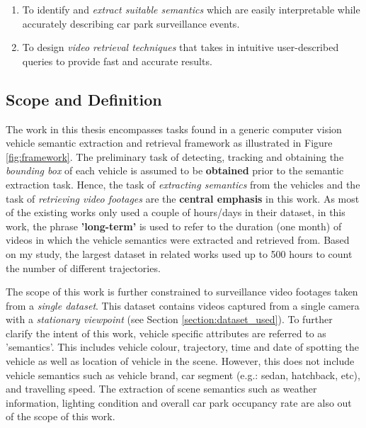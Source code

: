 \begin{enumerate}
  \item To identify and \textit{extract suitable semantics} which are easily interpretable while accurately describing car park surveillance events.
  \item To design \textit{video retrieval techniques} that takes in intuitive user-described queries to provide fast and accurate results.
\end{enumerate}

\subsection{Scope and Definition}
\label{subsec:scope}
The work in this thesis encompasses tasks found in a generic computer vision vehicle semantic extraction and retrieval framework as illustrated in Figure \ref{fig:framework}. The preliminary task of detecting, tracking and obtaining the \textit{bounding box} of each vehicle is assumed to be \textbf{obtained} prior to the semantic extraction task.
Hence, the task of \textit{extracting semantics} from the vehicles and the task of \textit{retrieving video footages} are the \textbf{central emphasis} in this work.
As most of the existing works only used a couple of hours/days in their dataset, in this work, the phrase \textbf{'long-term'} is used to refer to the duration (one month) of videos in which the vehicle semantics were extracted and retrieved from. Based on my study, the largest dataset in related works used up to 500 hours to count the number of different trajectories.


The scope of this work is further constrained to surveillance video footages taken from a \textit{single dataset}. This dataset contains videos captured from a single camera with a \textit{stationary viewpoint} (see Section \ref{section:dataset_used}). To further clarify the intent of this work, vehicle specific attributes are referred to as 'semantics'. This includes vehicle colour, trajectory, time and date of spotting the vehicle as well as location of vehicle in the scene. However, this does not include vehicle semantics such as vehicle brand, car segment (e.g.: sedan, hatchback, etc), and travelling speed. The extraction of scene semantics such as weather information, lighting condition and overall car park occupancy rate are also out of the scope of this work.


